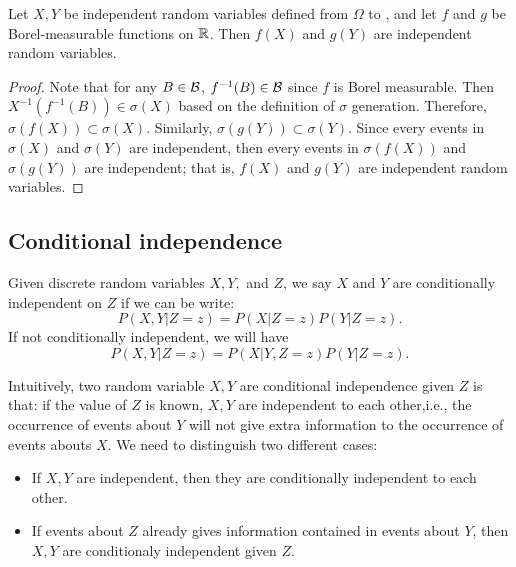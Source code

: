 \begin{refsection}
\begin{lemma}\label{ch:theory-of-probability:th:functionCompositionPreservesRandomVariableIndependence}
Let $X,Y$ be independent random variables defined from $\Omega$ to , and let $f$ and $g$ be Borel-measurable functions on $\mathbb{R}$. Then $f(X)$ and $g(Y)$ are independent random variables.	
\end{lemma}
\begin{proof}
Note that for any $B\in \mathcal{B}$, $f^{-1}(B) \in \mathcal{B}$ since $f$ is Borel measurable. Then $X^{-1}(f^{-1}(B)) \in \sigma(X)$ based on the definition of $\sigma$ generation. Therefore, $\sigma(f(X))\subset \sigma(X)$. Similarly, $\sigma(g(Y))\subset \sigma(Y)$. Since every events in $\sigma(X)$ and $\sigma(Y)$ are independent, then every events in $\sigma(f(X))$ and $\sigma(g(Y))$ are independent; that is, $f(X)$ and $g(Y)$ are independent random variables.
\end{proof}


\subsection{Conditional independence}


\begin{definition}\hfill
Given discrete random variables $X,Y,$ and $Z$, we say $X$ and $Y$ are conditionally independent on $Z$ if we can be write:
$$P(X,Y|Z=z) = P(X|Z=z)P(Y|Z=z).$$
If not conditionally independent, we will have 
$$P(X,Y|Z=z) = P(X|Y,Z=z)P(Y|Z=z).$$	
\end{definition}


\begin{remark}
Intuitively, two random variable $X,Y$ are conditional independence given $Z$ is that: if the value of $Z$ is known, $X,Y$ are independent to each other,i.e., the occurrence of events about $Y$ will not give extra information to the occurrence of events abouts $X$. We need to distinguish two different cases:
\begin{itemize}
	\item If $X,Y$ are independent, then they are conditionally independent to each other. 
	\item If events about $Z$ already gives information contained in events about $Y$, then $X,Y$ are conditionaly independent given $Z$. 
\end{itemize}
\end{remark}


\end{refsection}
